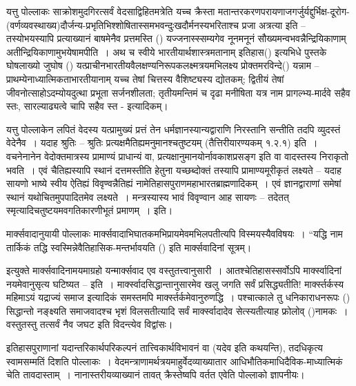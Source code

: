 यत्तु पोल्लाकः साक्रोशमुदगिरत्सर्वं वेदसाद्विहितमत्रेति यच्च क्रैस्ता मतान्तरकरणपरायणा\break जगर्जुर्यद्दुर्भिक्ष-दूरोग-(वर्णव्यवस्थाख्य)दौर्जन्य-प्रभृतिभिश्शोषितास्समभवन्दुःखदौर्मनस्यभरि\-ताश्च प्रजा अत्रत्या इति – तस्योभयस्यापि प्रत्याख्यानं बाषमेनैव प्रत्तमस्ति () यज्जनास्स्सम्यगेव नूनमनूनं सौख्यमन्वभवन्नैन्द्रियिकाणाम् अतीन्द्रियिकाणामुभयेषामपीति~। अथ च स्वीये भारतीयार्थशास्त्रमतानाम् इतिहास() इत्यभिधे पुस्तके घोषलाख्यो जुघोष () यत्प्राचीनभारतीयवैलक्षण्य\-निरूपकलक्ष्मत्रयमभिलक्ष्य प्रोक्तमरविन्दे() यन्नाम – प्राथम्येनाध्यात्मिकता\break भारतीयानाम् यच्च तेषां चित्तस्य वैशिष्ट्यस्य द्योतकम्; द्वितीयं तेषां जीवनोत्साहोऽदम्यो\break यदुत्था प्रभूता सर्जनशीलता; तृतीयमन्तिमं च दृढा मनीषिता यत्र नाम प्रागल्भ्य-मार्दवे सहैव स्तः, सारल्याढ्यत्वे चापि सहैव स्त - इत्यादिकम्।

यत्तु पोल्लाकेन लपितं वेदस्य यत्प्रामुख्यं प्रत्तं तेन धर्मज्ञानस्यान्यद्वाराणि निरस्तानि सन्तीति तदपि व्युदस्तं वेदेनैव~। यदाह श्रुतिः – श्रुतिः प्रत्यक्षमैतिह्यमनुमानश्चतुष्टयम् (तैत्तिरीयारण्यकम् १.२.१) इति~। वचनेनानेन वेदोक्तमात्रस्य प्रामाण्यं प्राधान्यं वा, प्रत्यक्षानुमानयोर्नावकाशप्रसङ्ग इति वा वादस्तस्य निराकृतो भवति~। एवं चैतिह्यस्यापि स्थानं दत्तमस्तीति हेतुना यच्छब्दोक्तं तस्यापि प्रामाण्यमूरीकृतं लक्ष्यते – यदाह सायणो भाष्ये स्वीय ऐतिह्यं विवृण्वन्नैतिह्यं नामेतिहासपुराणमहाभारतब्राह्मणादिकम्~। एवं ज्ञानद्वाराणां समेषां स्थानं यथोचितमुपपादितमेव लक्ष्यते~। मन्त्रस्यास्य भावं विवृण्वान आह सायणः – तदेतत् स्मृत्यादिचतुष्टयमवगतिकारणीभूतं प्रमाणम्~। इति।

मार्क्सवादानुयायी पोल्लाकः मार्क्सवादाभिघातकमभिप्रायमेवमभिलपतीत्यपि विस्मयस्यैव\break विषयः~। “यद्धि नाम तार्किकं तद्धि स्वस्मिन्नेवैतिहासिक-मन्तर्भावयति () इति मार्क्सवादिनां सूत्रम्।

इत्युक्ते मार्क्सवादिनामयमाग्रहो यन्मार्क्सवाद एव वस्तुतत्त्वानुसारी~। आतश्चेतिहासस्सर्वोऽपि मार्क्स्वादिनां नयमेवानुसृत्य घटिष्यत – इति~। मार्क्स्वादसिद्धान्तानुसारमेव खलु जगति सर्वं प्रसिद्ध्यतीति! मार्क्स्तर्कस्य महिमाऽयं यद्राज्यं समाज इत्यादिकं समस्तमपि मार्क्स्तर्कमेवानुरुणद्धि~। पश्चात्काले तु धनिकाराधनरूपः () सिद्धान्तो नङ्क्ष्यति समाजवादश्च भृशं विलसतीत्यादि सर्वं मार्क्स्वादादेव सेत्स्यतीत्याह फ्रोलोव् ()नामकः~। वस्तुतस्तु तत्सर्वं नैव जघट इति विदन्त्येव विद्वांसः।

इतिहासपुराणानां यदान्तरिकार्थपरिकल्पनं तात्त्विकार्थविभावनं वा (यदेव  इति कथयन्ति), तदधिकृत्य स्वामसम्मतिं दिशति पोल्लाकः~। वेदमन्त्राणामर्थत्रयमाहुर्वेदव्याख्यातार आधिभौतिकमाधिदैविक-माध्यात्मिकं चेति तावदास्ताम्~। नानास्तरीयव्याख्यानं तावत् क्रैस्तेष्वपि वर्तत एवेति पोल्लाको ज्ञापनीयः।


